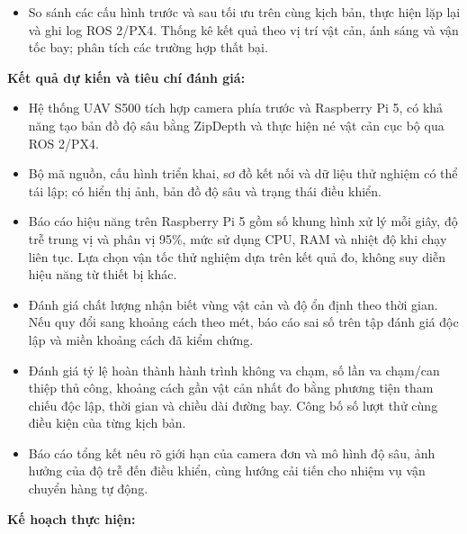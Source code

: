 \begin{mdframed}[style=decuongfield]
\begin{itemize}
\item So sánh các cấu hình trước và sau tối ưu trên cùng kịch bản, thực hiện lặp lại và ghi log ROS 2/PX4. Thống kê kết quả theo vị trí vật cản, ánh sáng và vận tốc bay; phân tích các trường hợp thất bại.
\end{itemize}
\par\vspace{1mm}
\noindent\makebox[\linewidth][l]{\hspace*{-2.5mm}\rule{\dimexpr\linewidth+5mm\relax}{0.4pt}}\par
\vspace{2mm}
\textbf{Kết quả dự kiến và tiêu chí đánh giá:}
\begin{itemize}
\item Hệ thống UAV S500 tích hợp camera phía trước và Raspberry Pi 5, có khả năng tạo bản đồ độ sâu bằng ZipDepth và thực hiện né vật cản cục bộ qua ROS 2/PX4.
\item Bộ mã nguồn, cấu hình triển khai, sơ đồ kết nối và dữ liệu thử nghiệm có thể tái lập; có hiển thị ảnh, bản đồ độ sâu và trạng thái điều khiển.
\item Báo cáo hiệu năng trên Raspberry Pi 5 gồm số khung hình xử lý mỗi giây, độ trễ trung vị và phân vị 95\%, mức sử dụng CPU, RAM và nhiệt độ khi chạy liên tục. Lựa chọn vận tốc thử nghiệm dựa trên kết quả đo, không suy diễn hiệu năng từ thiết bị khác.
\item Đánh giá chất lượng nhận biết vùng vật cản và độ ổn định theo thời gian. Nếu quy đổi sang khoảng cách theo mét, báo cáo sai số trên tập đánh giá độc lập và miền khoảng cách đã kiểm chứng.
\item Đánh giá tỷ lệ hoàn thành hành trình không va chạm, số lần va chạm/can thiệp thủ công, khoảng cách gần vật cản nhất đo bằng phương tiện tham chiếu độc lập, thời gian và chiều dài đường bay. Công bố số lượt thử cùng điều kiện của từng kịch bản.
\item Báo cáo tổng kết nêu rõ giới hạn của camera đơn và mô hình độ sâu, ảnh hưởng của độ trễ đến điều khiển, cùng hướng cải tiến cho nhiệm vụ vận chuyển hàng tự động.
\end{itemize}
\par\vspace{1mm}
\noindent\makebox[\linewidth][l]{\hspace*{-2.5mm}\rule{\dimexpr\linewidth+5mm\relax}{0.4pt}}\par
\vspace{2mm}
\textbf{Kế hoạch thực hiện:}
\begin{itemize}

\end{itemize}
\end{mdframed}
